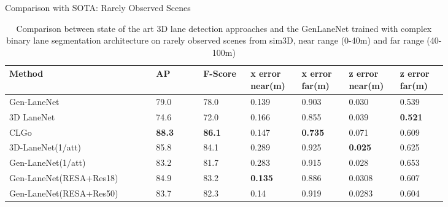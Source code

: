 \documentclass[aspectratio=169]{beamer}
\begin{document}
\begin{frame}{Comparison with SOTA: Rarely Observed Scenes}
     \begin{table}[h]
     \small
    \centering
    \caption{Comparison between state of the art 3D lane detection approaches and the GenLaneNet trained with complex binary lane segmentation architecture on rarely observed scenes from sim3D, near range (0-40m) and far range (40-100m) }
    \begin{tabular}{|p{0.29\linewidth}|p{0.09\linewidth}|p{0.09\linewidth}|p{0.09\linewidth}|p{0.09\linewidth}|p{0.09\linewidth}|p{0.09\linewidth}|}
    \hline
        \textbf{Method} & \textbf{AP} & \textbf{F-Score} & \textbf{x error near(m)} & \textbf{x error far(m)} & \textbf{z error near(m)} & \textbf{z error far(m)} \\ \hline
        Gen-LaneNet & 79.0 & 78.0 & 0.139 & 0.903 & 0.030 & 0.539 \\ \hline
        3D LaneNet & 74.6 & 72.0 & 0.166 & 0.855 & 0.039 &\textbf{ 0.521} \\ \hline
        CLGo &\textbf{ 88.3} &\textbf{ 86.1} & 0.147 & \textbf{0.735} & 0.071 & 0.609 \\ \hline
        3D-LaneNet(1/att)& 85.8 & 84.1 & 0.289 & 0.925 &\textbf{ 0.025} & 0.625 \\ \hline
        Gen-LaneNet(1/att)& 83.2 & 81.7 & 0.283 & 0.915 & 0.028 & 0.653 \\ \hline
        Gen-LaneNet(RESA+Res18) &  84.9 & 83.2 &\textbf{ 0.135} & 0.886 & 0.0308 & 0.607 \\ \hline
        Gen-LaneNet(RESA+Res50) & 83.7 & 82.3 & 0.14 & 0.919 & 0.0283 & 0.604 \\ \hline
    \end{tabular}
\end{table}
\end{frame}
\end{document}
